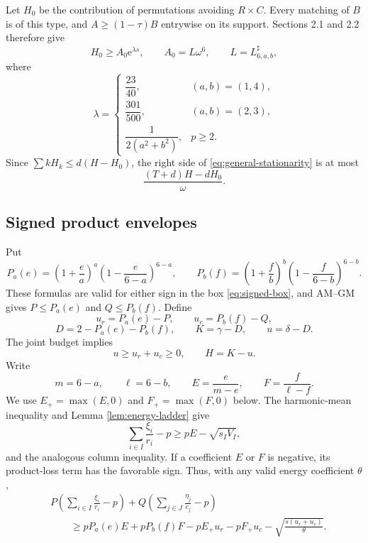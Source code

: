 \documentclass[11pt]{article}
\theoremstyle{definition}
\newcommand{\e}{\mathrm e}
\begin{document}
Let $H_0$ be the contribution of permutations avoiding $R\times C$.  Every
matching of $B$ is of this type, and $A\ge(1-\tau)B$ entrywise on its support.
Sections 2.1 and 2.2 therefore give
\[
 H_0\ge A_0\e^{\lambda s},
 \qquad
 A_0=L\omega^6,
 \qquad
 L=L^{\sharp}_{6,a,b},
 \tag{4.6}\label{eq:H0-general}
\]
where
\[
 \lambda=
 \begin{cases}
 \dfrac{23}{40},&(a,b)=(1,4),\\[1mm]
 \dfrac{301}{500},&(a,b)=(2,3),\\[1mm]
 \dfrac1{2(a^2+b^2)},&p\ge2.
 \end{cases}
 \tag{4.7}\label{eq:lambda-pairs}
\]
Since $\sum kH_k\le d(H-H_0)$, the right side of
\eqref{eq:general-stationarity} is at most
\[
 \frac{(T+d)H-dH_0}{\omega}.
 \tag{4.8}\label{eq:stationarity-upper-general}
\]

\subsection{Signed product envelopes}

Put
\[
 P_a(e)=\left(1+\frac ea\right)^a
        \left(1-\frac e{6-a}\right)^{6-a},
 \qquad
 P_b(f)=\left(1+\frac fb\right)^b
        \left(1-\frac f{6-b}\right)^{6-b}.
 \tag{4.9}\label{eq:signed-envelopes}
\]
These formulas are valid for either sign in the box \eqref{eq:signed-box}, and
AM--GM gives $P\le P_a(e)$ and $Q\le P_b(f)$.  Define
\[
 u_r=P_a(e)-P,
 \qquad
 u_c=P_b(f)-Q,
\]
\[
 D=2-P_a(e)-P_b(f),
 \qquad
 K=\gamma-D,
 \qquad
 u=\delta-D.
 \tag{4.10}\label{eq:DKu}
\]
The joint budget implies
\[
 u\ge u_r+u_c\ge0,
 \qquad
 H=K-u.
 \tag{4.11}\label{eq:u-general}
\]
Write
\[
 m=6-a,
 \qquad \ell=6-b,
 \qquad
 E=\frac e{m-e},
 \qquad F=\frac f{\ell-f}.
 \tag{4.12}\label{eq:EF-general}
\]
We use $E_+=\max(E,0)$ and $F_+=\max(F,0)$ below.
The harmonic-mean inequality and Lemma \ref{lem:energy-ladder} give
\[
 \sum_{i\in I}\frac{\xi_i}{r_i}-p
 \ge pE-\sqrt{s_I V_I},
 \tag{4.13}\label{eq:harmonic-core-row}
\]
and the analogous column inequality.  If a coefficient $E$ or $F$ is
negative, its product-loss term has the favorable sign.  Thus, with any valid
energy coefficient $\theta$,
\[
 \begin{aligned}
 &P\left(\sum_{i\in I}\frac{\xi_i}{r_i}-p\right)
 +Q\left(\sum_{j\in J}\frac{\eta_j}{c_j}-p\right)\\
 &\qquad\ge
 pP_a(e)E+pP_b(f)F
 -pE_+u_r-pF_+u_c
 -\sqrt{\frac{s(u_r+u_c)}{\theta}}.
 \end{aligned}
 \tag{4.14}\label{eq:stationarity-lower-penalized}
\]
\end{document}
